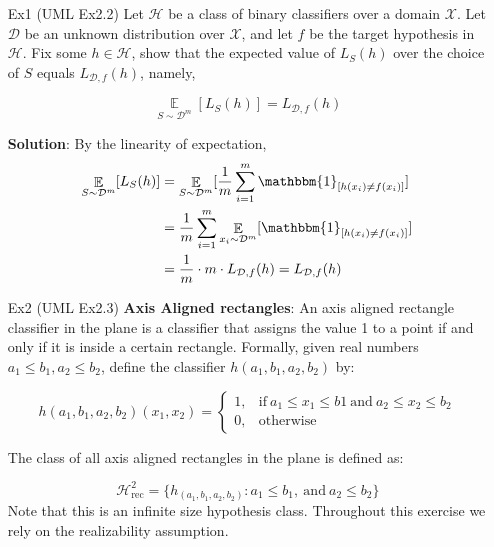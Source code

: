 \documentclass{article}
\begin{document}
\begin{itemize}
\item[Ex1] (UML Ex2.2) Let $\mathcal{H}$ be a class of binary classifiers over a domain $\mathcal{X}$. Let $\mathcal{D}$ be an unknown distribution over $\mathcal{X}$, and let $f$ be the target hypothesis in $\mathcal{H}$. Fix some $h\in\mathcal{H}$, show that the expected value of $L_S(h)$ over the choice of $S$ equals $L_{\mathcal{D},f}(h)$, namely,

\begin{equation*}
\mathop\mathbb{E}\limits_{S\sim\mathcal{D}^m}[L_S(h)]=L_{\mathcal{D},f}(h)
\end{equation*}

\item[] \textbf{Solution}: By the linearity of expectation,
\begin{equation*}
\begin{split}
\mathop\mathbb{E}\limits_{S\sim\mathcal{D}^m}[L_S(h)] 
&= \mathop\mathbb{E}\limits_{S\sim\mathcal{D}^m}[\frac{1}{m}\sum_{i=1}^m \mathbbm{1}_{[h(x_i)\neq f(x_i)]}] \\
&= \frac{1}{m}\sum_{i=1}^m \mathop\mathbb{E}\limits_{x_i \sim\mathcal{D}^m}[\mathbbm{1}_{[h(x_i)\neq f(x_i)]}] \\
&= \frac{1}{m} \cdot m \cdot L_{\mathcal{D},f}(h) = L_{\mathcal{D},f}(h)
\end{split}
\end{equation*}

\item[Ex2] (UML Ex2.3) \textbf{Axis Aligned rectangles}: An axis aligned rectangle classifier in the plane is a classifier that assigns the value 1 to a point if and only if it is inside a certain rectangle. Formally, given real numbers $a_1\leq b_1,a_2\leq b_2$, define the classifier $h(a_1,b_1,a_2,b_2)$ by:

	\begin{equation*}
	h(a_1,b_1,a_2,b_2)(x_1, x_2) = \left\{\begin{matrix}
	1,& \mathrm{if}\ a_1 \leq x_1 \leq b1\ \mathrm{and}\  a_2 \leq x_2 \leq b_2 \\
	0,& \mathrm{otherwise}
	\end{matrix}\right.
	\end{equation*}

	The class of all axis aligned rectangles in the plane is defined as:
	
	\begin{equation*}
	\mathcal{H}^2_{\mathrm{rec}}=\{h_{(a_1,b_1,a_2,b_2)}:a_1\leq b_1,\ \mathrm{and}\ a_2\leq b_2\}
	\end{equation*}
Note that this is an infinite size hypothesis class. Throughout this exercise we rely on the realizability assumption.


\end{itemize}
\end{document}
